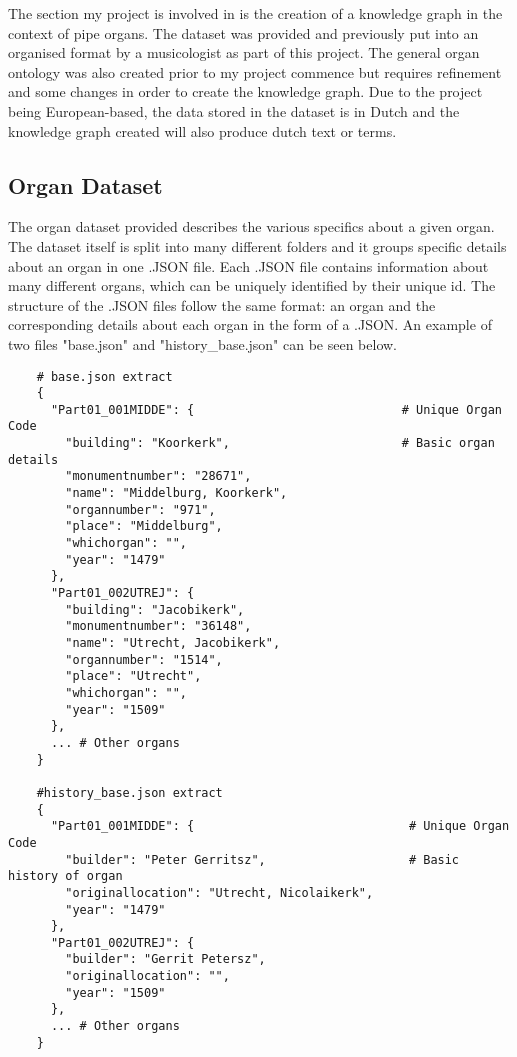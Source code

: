 The section my project is involved in is the creation of a knowledge graph in the context of pipe organs. The dataset was provided and previously put into an organised format by a musicologist as part of this project. The general organ ontology was also created prior to my project commence but requires refinement and some changes in order to create the knowledge graph. Due to the project being European-based, the data stored in the dataset is in Dutch and the knowledge graph created will also produce dutch text or terms.  

\subsection{Organ Dataset}
\hspace{0.5cm} The organ dataset provided describes the various specifics about a given organ. The dataset itself is split into many different folders and it groups specific details about an organ in one .JSON file. Each .JSON file contains information about many different organs, which can be uniquely identified by their unique id. The structure of the .JSON files follow the same format: an organ and the corresponding details about each organ in the form of a .JSON. An example of two files "base.json" and "history\_base.json" can be seen below. 

\begin{lstlisting}
    # base.json extract
    {
      "Part01_001MIDDE": {                             # Unique Organ Code
        "building": "Koorkerk",                        # Basic organ details
        "monumentnumber": "28671",
        "name": "Middelburg, Koorkerk",
        "organnumber": "971",
        "place": "Middelburg",
        "whichorgan": "",
        "year": "1479"
      },
      "Part01_002UTREJ": {
        "building": "Jacobikerk",
        "monumentnumber": "36148",
        "name": "Utrecht, Jacobikerk",
        "organnumber": "1514",
        "place": "Utrecht",
        "whichorgan": "",
        "year": "1509"
      },
      ... # Other organs
    }

    #history_base.json extract
    {
      "Part01_001MIDDE": {                              # Unique Organ Code
        "builder": "Peter Gerritsz",                    # Basic history of organ
        "originallocation": "Utrecht, Nicolaikerk",
        "year": "1479"
      },
      "Part01_002UTREJ": {
        "builder": "Gerrit Petersz",
        "originallocation": "",
        "year": "1509"
      },
      ... # Other organs
    }
\end{lstlisting}

